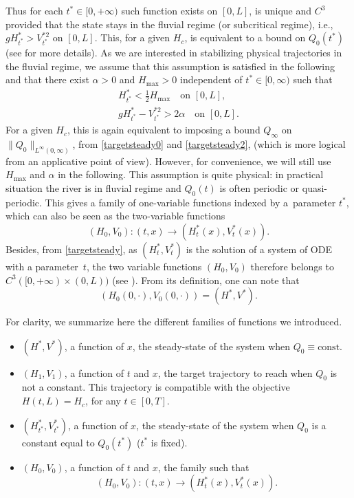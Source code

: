 \documentclass[11pt]{article}
\newcommand{\ie}{i.e.,\xspace}
\numberwithin{equation}{section}
\theoremstyle{definition}
\begin{document}
Thus for each $t^{*}\in[0,+\infty)$ such function exists on $[0,L]$, is unique and $C^{3}$ provided that the state stays in the fluvial regime (or subcritical regime), \ie $g H_{t^{*}}^{*}>V^{*2}_{t^{*}}$ on $[0,L]$.
This, for a given $H_{c}$, is equivalent to a bound on $Q_{0}(t^{*})$
(see \cite{HS} for more details).
As we are interested in {stabilizing} physical trajectories in the fluvial regime, we assume that this assumption is satisfied {in the following} and that
there exist $\alpha>0$ and $H_{\max}>0$ independent of $t^{*}\in[0,\infty)$ such that
\begin{equation}
\begin{split}
H_{t^{*}}^{*}<\frac{1}{2}H_{\max}\quad\text{on }[0,L],\\
gH_{t^{*}}^{*}-V_{{t^{*}}}^{*2}>2\alpha\quad\text{on }[0,L].
\end{split}
\label{fluvial0}
\end{equation}
For a given $H_{c}$, this is again equivalent to imposing a bound $Q_{\infty}$ on $\lVert Q_{0}\rVert_{L^{\infty}(0,\infty)}$, from \eqref{targetsteady0} and \eqref{targetsteady2},
(which is more logical {from an applicative point of view}).
However, for convenience, we will still use $H_{\max}$ and $\alpha$ in the following. This assumption is quite physical: in practical situation the river is in fluvial regime and $Q_{0}(t)$ is often periodic or quasi-periodic.
This gives a family of one-variable functions indexed by a~parameter $t^{*}$, which can also be seen as the two-variable functions
\begin{equation*}
(H_{0},V_{0}) : (t,x)\to (H^{*}_{t}(x),V^{*}_{t}(x)).
\end{equation*}
Besides, from \eqref{targetsteady}, as $(H_{t}^{*},V_{t}^{*})$
is the solution of a system of ODE with a parameter~$t$, the two variable functions $(H_{0},V_{0})$ therefore belongs to $C^{3}([0,+\infty)\times(0,L))$ (see \cite[Chap.\,5, Cor.\,4.1]{Hartman}).
{From} its definition, one can note that
\[
(H_{0}(0,\cdot),V_{0}(0,\cdot))=(H^{*},V^{*}).
\]

For clarity, we summarize here the different families of functions we introduced.
\begin{itemize}
\item
$(H^{*},V^{*})$, a function of $x$, the steady-state of the system when $Q_{0}\equiv \text{const.}$
\item
$(H_{1},V_{1})$, a function of $t$ and $x$, the target trajectory to reach when $Q_{0}$ is not a
constant. This trajectory is compatible with the objective $H(t,L) = H_{c}$, for any $t\in [0,T]$.
\item
$(H^{*}_{t^{*}},V^{*}_{t^{*}})$, a function of $x$, the steady-state of the system when $Q_{0}$ is a constant equal to $Q_{0}({t^{*}})$ ($t^{*}$ is fixed).
\item
$(H_{0},V_{0})$, a function of $t$ and $x$, the family such that
\[
(H_{0}, V_{0}):(t,x) \to (H_{t}^{*}(x),V^{*}_{t}(x)).
\]
\end{itemize}
\end{document}
